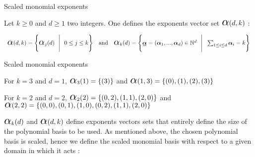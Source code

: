 \documentclass[fleqn]{article}
\begin{document}
        \begin{defbox}{Scaled monomial exponents}

          Let $k \geq 0$ and $d \geq 1$ two integers. One defines the exponents vector set $\captize{\alpha}(d, k)$ : 

          \begin{equation}
            \begin{array}{lll}
              \captize{\alpha}(d, k) =
              \Bigg\{
                \captize{\alpha}_j(d)
                \ \ \Bigg\vert \ \ 
                0 \leq j \leq k
              \Bigg\}
              &
              \mbox{and}
              &
              \captize{\alpha}_k(d) =
              \Bigg\{
                \tensori{\alpha} = (\tensoro{\alpha}\subscript{1}, ..., \tensoro{\alpha}\subscript{d}) \in \mathbb{N}^d
                \ \ \Bigg\vert \ \ 
                \sum_{1 \leq i \leq d} \tensoro{\alpha}\subscript{i} = k
              \Bigg\}
            \end{array}
          \end{equation}


        \end{defbox}
        
        \begin{exemplebox}{Scaled monomial exponents}

          For $k = 3$ and $d = 1$, $\captize{\alpha}_3(1) = \{ (3) \}$ and $\captize{\alpha}(1,3) = \{ (0), (1), (2),  (3) \}$

          For $k = 2$ and $d = 2$, $\captize{\alpha}_2(2) = \{ (0,2), (1,1), (2,0) \}$ and $\captize{\alpha}(2,2) = \{ (0,0), (0,1), (1,0), (0,2), (1,1), (2,0) \}$

        \end{exemplebox}

        $\captize{\alpha}_k(d)$ and $\captize{\alpha}(d,k)$ define exponents vectors sets that entirely define the size of the polynomial basis to be used. As mentioned above, the chosen polynomial basis is scaled, hence we define the scaled monomial basis with respect to a given domain in which it acts :
\end{document}
